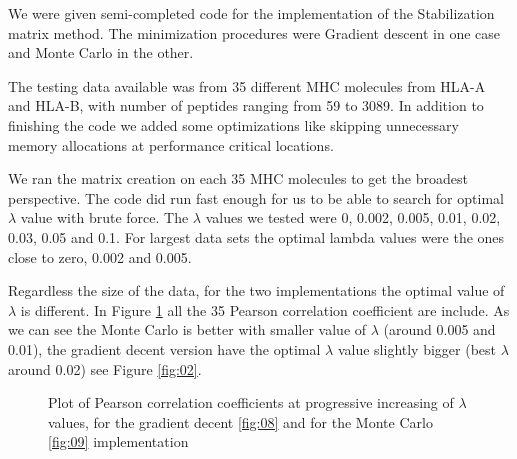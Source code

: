 \documentclass{bioinfo}
\begin{document}
\begin{application}
We were given semi-completed code for the implementation of the Stabilization matrix method. The minimization procedures were Gradient descent in one case and Monte Carlo in the other. 
\par The testing data available was from 35 different MHC molecules from HLA-A and HLA-B, with number of peptides ranging from 59 to 3089. In addition to finishing the code we added some optimizations like skipping unnecessary memory allocations at performance critical locations.
\par We ran the matrix creation on each 35 MHC molecules to get the broadest perspective. The code did run fast enough for us to be able to search for optimal $\lambda$ value with brute force. The $\lambda$ values we tested were 0, 0.002, 0.005, 0.01, 0.02, 0.03, 0.05 and 0.1. For largest data sets the optimal lambda values were the ones close to zero, 0.002 and 0.005.
\par Regardless the size of the data, for the two implementations the optimal value of $\lambda$ is different. In Figure \ref{fig:07} all the 35 Pearson correlation coefficient are include. As we can see the Monte Carlo is better with smaller value of $\lambda$ (around 0.005 and 0.01), the gradient decent version have the optimal $\lambda$ value slightly bigger (best $\lambda$ around 0.02) see Figure \ref{fig:02}.



\begin{figure}[!tpb]
\begin{center}
\end{center}
\caption{Plot of Pearson correlation coefficients at progressive increasing of $\lambda$ values, for the gradient decent \ref{fig:08} and for the Monte Carlo \ref{fig:09} implementation}
\label{fig:07}
\end{figure}


\end{application}
\end{document}
